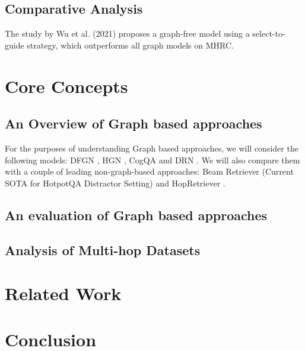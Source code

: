 \documentclass[sigplan,screen]{acmart}
\begin{document}
\subsection{Comparative Analysis}
The study by Wu et al. (2021) \cite{RN106} proposes a graph-free model using a select-to-guide strategy, which outperforms all graph models on MHRC.

\section{Core Concepts}
\subsection{An Overview of Graph based approaches}
For the purposes of understanding Graph based approaches, we will consider the following models:
DFGN \cite{RN122}, HGN \cite{RN119}, CogQA \cite{RN118} and DRN \cite{RN142}. We will also compare them with 
a couple of leading non-graph-based approaches: Beam Retriever (Current SOTA for HotpotQA Distractor Setting) \cite{RN105} and
HopRetriever \cite{RN149}.


\subsection{An evaluation of Graph based approaches}

\subsection{Analysis of Multi-hop Datasets}

\section{Related Work}

\section{Conclusion}



\end{document}
